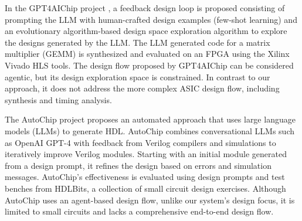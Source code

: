 In the GPT4AIChip project \cite{gpt4aigchip}, a feedback design loop is proposed consisting of prompting the LLM with human-crafted design examples (few-shot learning) and an evolutionary algorithm-based design space exploration algorithm to explore the designs generated by the LLM.  The LLM generated code for a matrix multiplier (GEMM) is synthesized and evaluated on an FPGA using the Xilinx Vivado HLS tools. The design flow proposed by GPT4AIChip can be considered agentic, but its design exploration space is constrained. In contrast to our approach, it does not address the more complex ASIC design flow, including synthesis and timing analysis.

The AutoChip \cite{autochip} project proposes an automated approach that uses large language models (LLMs) to generate HDL. AutoChip combines conversational LLMs such as OpenAI GPT-4 with feedback from Verilog compilers and simulations to iteratively improve Verilog modules. Starting with an initial module generated from a design prompt, it refines the design based on errors and simulation messages. AutoChip's effectiveness is evaluated using design prompts and test benches from HDLBits, a collection of small circuit design exercises. Although AutoChip uses an agent-based design flow, unlike our system's design focus, it is limited to small circuits and lacks a comprehensive end-to-end design flow.

 
